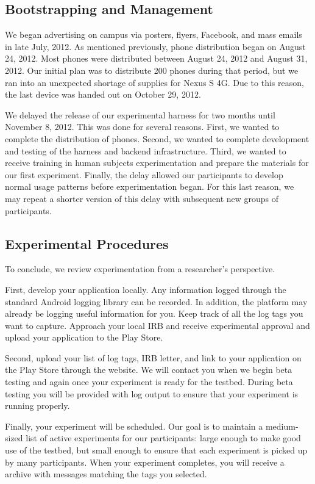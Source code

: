 \subsection{Bootstrapping and Management}

We began advertising \PhoneLab{} on campus via posters, flyers, Facebook, and
mass emails in late July, 2012. As mentioned previously, \PhoneLab{} phone
distribution began on August 24, 2012. Most phones were distributed between
August 24, 2012 and August 31, 2012. Our initial plan was to distribute 200
phones during that period, but we ran into an unexpected shortage of
supplies for Nexus S 4G. Due to this reason, the last device was handed out on
October 29, 2012.

We delayed the release of our experimental harness for two months until
November 8, 2012. This was done for several reasons. First, we wanted to
complete the distribution of phones. Second, we wanted to complete development
and testing of the harness and backend infrastructure. Third, we wanted to
receive training in human subjects experimentation and prepare the materials for
our first experiment. Finally, the delay allowed our participants to develop
normal usage patterns before experimentation began. For this last reason, we may
repeat a shorter version of this delay with subsequent new groups of \PhoneLab{}
participants.



\subsection{Experimental Procedures}

To conclude, we review \PhoneLab{} experimentation from a researcher's
perspective.

First, develop your application locally. Any information logged through the
standard Android logging library can be recorded. In addition, the platform may
already be logging useful information for you. Keep track of all the log tags
you want \PhoneLab{} to capture. Approach your local IRB and receive
experimental approval and upload your application to the Play Store.

Second, upload your list of log tags, IRB letter, and link to your
application on the Play Store through the \PhoneLab{} website. We will
contact you when we begin beta testing and again once your experiment is
ready for the testbed. During beta testing you will be provided with
\PhoneLab{} log output to ensure that your experiment is running properly.

Finally, your experiment will be scheduled. Our goal is to maintain a
medium-sized list of active experiments for our participants: large enough to
make good use of the testbed, but small enough to ensure that each experiment
is picked up by many participants. When your experiment completes, you will
receive a archive with messages matching the tags you selected.
